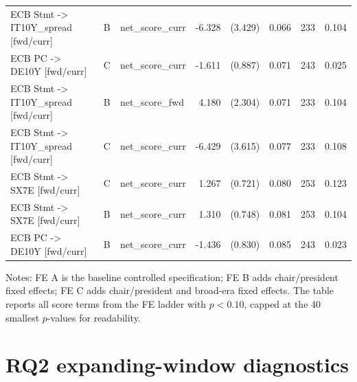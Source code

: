 \begin{table}[H]
\begin{threeparttable}
{\begin{tabular}{lllrrrrr}
ECB Stmt -> IT10Y\_spread [fwd/curr] & B & net\_score\_curr & -6.328\sym{*} & (3.429) & 0.066 & 233 & 0.104 \\
ECB PC -> DE10Y [fwd/curr] & C & net\_score\_curr & -1.611\sym{*} & (0.887) & 0.071 & 243 & 0.025 \\
ECB Stmt -> IT10Y\_spread [fwd/curr] & B & net\_score\_fwd & 4.180\sym{*} & (2.304) & 0.071 & 233 & 0.104 \\
ECB Stmt -> IT10Y\_spread [fwd/curr] & C & net\_score\_curr & -6.429\sym{*} & (3.615) & 0.077 & 233 & 0.108 \\
ECB Stmt -> SX7E [fwd/curr] & C & net\_score\_curr & 1.267\sym{*} & (0.721) & 0.080 & 253 & 0.123 \\
ECB Stmt -> SX7E [fwd/curr] & B & net\_score\_curr & 1.310\sym{*} & (0.748) & 0.081 & 253 & 0.104 \\
ECB PC -> DE10Y [fwd/curr] & B & net\_score\_curr & -1.436\sym{*} & (0.830) & 0.085 & 243 & 0.023 \\
\bottomrule
\end{tabular}
}
\begin{tablenotes}
\footnotesize
\item Notes: FE A is the baseline controlled specification; FE B adds chair/president fixed effects; FE C adds chair/president and broad-era fixed effects. The table reports all score terms from the FE ladder with $p<0.10$, capped at the 40 smallest $p$-values for readability.
\end{tablenotes}
\end{threeparttable}
\end{table}


\section{RQ2 expanding-window diagnostics}
\label{app:a2_rq2_diagnostics}

